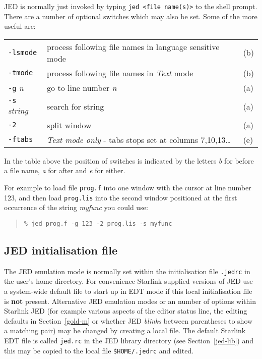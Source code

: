 \documentclass[twoside,11pt]{article}
\newcommand{\xlabel}[1]{}
\begin{document}
JED is normally just invoked by typing \texttt{jed <file name(s)>} to
the shell prompt. There are a number of optional switches which may
also be set. Some of the more useful are: 
\begin{center}
\begin{tabular}{lll}
\texttt{-lsmode} & process following file names in language sensitive mode & (b)\\
\texttt{-tmode} & process following file names in \textit{Text} mode & (b)\\
\texttt{-g} \textit{n} & go to line number \textit{n} & (a)\\
\texttt{-s} \textit{string} & search for string & (a)\\
\texttt{-2} & split window & (a)\\
\texttt{-ftabs} & \textit{Text mode only} - tabs stops set at columns 7,10,13\ldots & (e)\\
\end{tabular}
\end{center}

In the table above the position of switches is indicated by the letters 
\textit{b} for before a file name, \textit{a} for after and \textit{e} for
either.

For example to load file \texttt{prog.f} into one window with the cursor at
line number 123, and then load \texttt{prog.lis} into the second window
positioned at the first occurrence of the string \textit{myfunc} you could
use:
\begin{quote}
\begin{verbatim}
% jed prog.f -g 123 -2 prog.lis -s myfunc
\end{verbatim}
\end{quote}

\subsection{\xlabel{jed_initialisation_file}JED initialisation file}
\label{jed_initialisation_file}

The JED emulation mode is normally set within the initialisation file
\texttt{.jedrc} in the user's home directory. For convenience Starlink
supplied versions of JED use a system-wide default file to start up in EDT
mode if this local initialisation file is \textbf{not} present.
Alternative JED emulation modes
or an number of options within Starlink JED (for example various
aspects of the editor status line, the editing defaults in
Section~{\ref{gold-m}} or whether JED \textit{blinks} between
parentheses to show a matching pair) may be changed by creating a
local file. The default Starlink EDT file is called
\label{default-jedrc}
\texttt{jed.rc} in the JED library directory (see
Section~{\ref{jed-lib}}) and this may be copied to the local file
\texttt{\$HOME/.jedrc} and edited.
\end{document}

